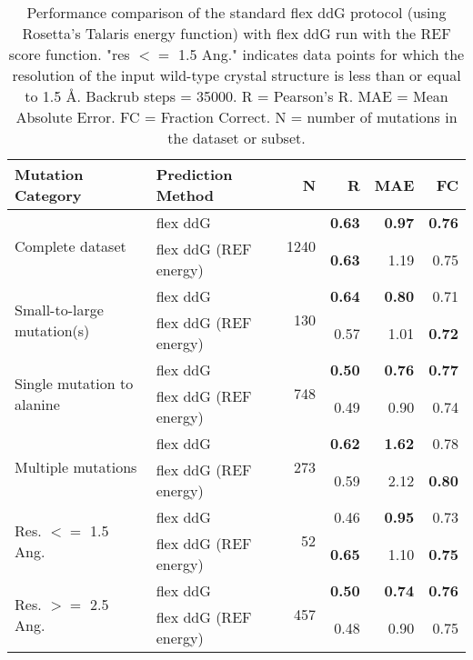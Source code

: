 \begin{table}
  \begin{tabular}{llrrrr}
\toprule
Mutation Category &      Prediction Method &     N &    R &  MAE &   FC \\
\midrule
 \multirow{ 2}{*}{Complete dataset} & flex ddG & \multirow{ 2}{*}{1240} & \textbf{0.63} & \textbf{0.97} & \textbf{0.76}  \\
 & flex ddG (REF energy) & & \textbf{0.63} & 1.19 & 0.75  \\
\hline
 \multirow{ 2}{*}{Small-to-large mutation(s)} & flex ddG & \multirow{ 2}{*}{130} & \textbf{0.64} & \textbf{0.80} & 0.71  \\
 & flex ddG (REF energy) & & 0.57 & 1.01 & \textbf{0.72}  \\
\hline
 \multirow{ 2}{*}{Single mutation to alanine} & flex ddG & \multirow{ 2}{*}{748} & \textbf{0.50} & \textbf{0.76} & \textbf{0.77}  \\
 & flex ddG (REF energy) & & 0.49 & 0.90 & 0.74  \\
\hline
 \multirow{ 2}{*}{Multiple mutations} & flex ddG & \multirow{ 2}{*}{273} & \textbf{0.62} & \textbf{1.62} & 0.78  \\
 & flex ddG (REF energy) & & 0.59 & 2.12 & \textbf{0.80}  \\
\hline
 \multirow{ 2}{*}{Res. $<=$ 1.5 Ang.} & flex ddG & \multirow{ 2}{*}{52} & 0.46 & \textbf{0.95} & 0.73  \\
 & flex ddG (REF energy) & & \textbf{0.65} & 1.10 & \textbf{0.75}  \\
\hline
 \multirow{ 2}{*}{Res. $>=$ 2.5 Ang.} & flex ddG & \multirow{ 2}{*}{457} & \textbf{0.50} & \textbf{0.74} & \textbf{0.76}  \\
 & flex ddG (REF energy) & & 0.48 & 0.90 & 0.75  \\
\bottomrule
\end{tabular}
  \caption[REF results]{
    Performance comparison of the standard flex ddG protocol (using Rosetta's Talaris energy function) with flex ddG run with the REF score function. "res $<=$ 1.5 Ang." indicates data points for which the resolution of the input wild-type crystal structure is less than or equal to 1.5 \AA. Backrub steps = 35000. R = Pearson's R. MAE = Mean Absolute Error. FC = Fraction Correct. N = number of mutations in the dataset or subset.
  } \label{tab:table-ref}
\end{table}
